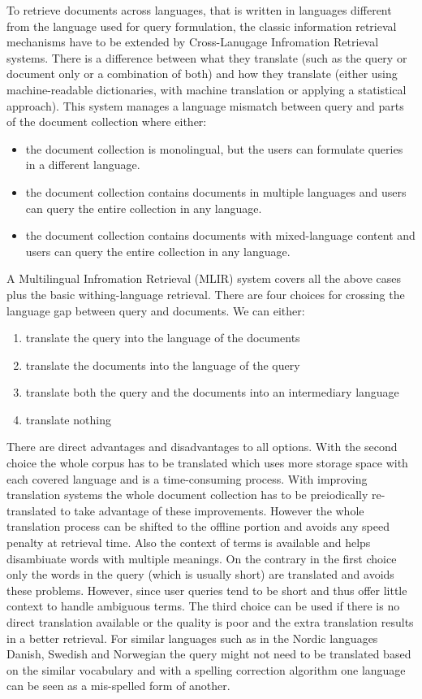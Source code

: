 \documentclass[journal]{IEEEtran}
\begin{document}
To retrieve documents across languages, that is written in languages different from the language used for query formulation, the classic information retrieval mechanisms have to be extended by Cross-Lanugage Infromation Retrieval systems.
There is a difference between what they translate (such as the query or document only or a combination of both) and how they translate (either using machine-readable dictionaries, with machine translation or applying a statistical approach).
This system manages a language mismatch between query and parts of the document collection where either:
\begin{itemize}
	\item the document collection is monolingual, but the users can formulate queries in a different language.
	\item the document collection contains documents in multiple languages and users can query the entire collection in any language.
	\item the document collection contains documents with mixed-language content and users can query the entire collection in any language.
\end{itemize}
A Multilingual Infromation Retrieval (MLIR) system covers all the above cases plus the basic withing-language retrieval.
There are four choices for crossing the language gap between query and documents.
We can either:
\begin{enumerate}
	\item translate the query into the language of the documents
	\item translate the documents into the language of the query
	\item translate both the query and the documents into an intermediary language
	\item translate nothing
\end{enumerate}
There are direct advantages and disadvantages to all options.
With the second choice the whole corpus has to be translated which uses more storage space with each covered language and is a time-consuming process.
With improving translation systems the whole document collection has to be preiodically re-translated to take advantage of these improvements.
However the whole translation process can be shifted to the offline portion and avoids any speed penalty at retrieval time.
Also the context of terms is available and helps disambiuate words with multiple meanings.
On the contrary in the first choice only the words in the query (which is usually short) are translated and avoids these problems.
However, since user queries tend to be short and thus offer little context to handle ambiguous terms.
The third choice can be used if there is no direct translation available or the quality is poor and the extra translation results in a better retrieval.
For similar languages such as in the Nordic languages Danish, Swedish and Norwegian the query might not need to be translated based on the similar vocabulary and with a spelling correction algorithm one language can be seen as a mis-spelled form of another.
\end{document}
